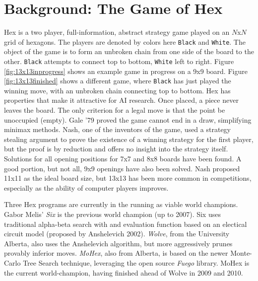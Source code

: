 \documentclass[10pt,a4paper]{report}
\newcommand{\black}{\texttt{Black}}
\newcommand{\white}{\texttt{White}}
\begin{document}
\section{Background: The Game of Hex}
Hex is a two player, full-information, abstract strategy game played on an $N$x$N$ grid of hexagons. The players are denoted by colors here \black{} and \white. The object of the game is to form an unbroken chain from one side of the board to the other. \black{} attempts to connect top to bottom, \white{} left to right. Figure \ref{fig:13x13inprogress} shows an example game in progress on a 9x9 board. Figure \ref{fig:13x13finished} shows a different game, where \black{} has just played the winning move, with an unbroken chain connecting top to bottom. Hex has properties that make it attractive for AI research. Once placed, a piece never leaves the board. The only criterion for a legal move is that the point be unoccupied (empty). Gale '79 proved the game cannot end in a draw, simplifying minimax methods. Nash, one of the inventors of the game, used a strategy stealing argument to prove the existence of a winning strategy for the first player, but the proof is by reduction and offers no insight into the strategy itself. Solutions for all opening positions for 7x7 and 8x8 boards have been found\cite{henderson2009solving}. A good portion, but not all, 9x9 openings have also been solved. Nash proposed 11x11 as the ideal board size, but 13x13 has been more common in competitions, especially as the ability of computer players improves.

Three Hex programs are currently in the running as viable world champions. Gabor Melis' \emph{Six} is the previous world champion (up to 2007). Six uses traditional alpha-beta search with and evaluation function based on an electical circuit model (proposed by Anshelevich 2002)\cite{anshelevich2002hierarchical}. \emph{Wolve}, from the University Alberta, also uses the Anshelevich algorithm, but more aggressively prunes provably inferior moves. \emph{MoHex}, also from Alberta, is based on the newer Monte-Carlo Tree Search technique, leveraging the open source \emph{Fuego} library. MoHex is the current world-champion, having finished ahead of Wolve in 2009 and 2010.
\end{document}
